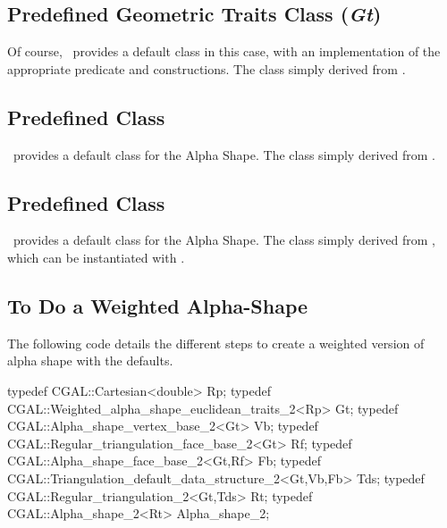 
\subsection*{Predefined Geometric Traits Class (\mbox{\it Gt})}

Of course, \cgal\ provides a default  class in this
case, with an implementation of the appropriate predicate and constructions.
The class  simply derived from 
.


\subsection*{Predefined \protect {} Class}

\cgal\ provides a default  class
for the Alpha Shape. The class
 simply derived from 
.


\subsection*{Predefined \protect {} Class}

\cgal\ provides a default  class
for the Alpha Shape. The class
 simply derived from 
, which can be instantiated with .



\subsection*{To Do a Weighted Alpha-Shape}

\ccExample
The following code details the different steps to create 
a weighted version of alpha shape with the defaults.

\begin{cprog}
typedef CGAL::Cartesian<double> Rp;
typedef CGAL::Weighted_alpha_shape_euclidean_traits_2<Rp> Gt;
typedef CGAL::Alpha_shape_vertex_base_2<Gt> Vb;
typedef CGAL::Regular_triangulation_face_base_2<Gt> Rf;
typedef CGAL::Alpha_shape_face_base_2<Gt,Rf>  Fb;
typedef CGAL::Triangulation_default_data_structure_2<Gt,Vb,Fb> Tds;
typedef CGAL::Regular_triangulation_2<Gt,Tds> Rt;
typedef CGAL::Alpha_shape_2<Rt> Alpha_shape_2;
\end{cprog}
